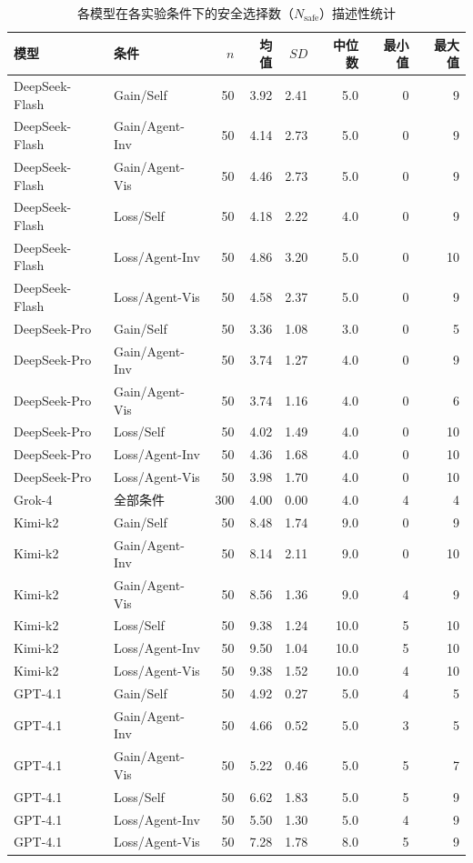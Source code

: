 \documentclass[journal]{vgtc}
\begin{document}
\begin{table}[tb]
  \caption{各模型在各实验条件下的安全选择数（$N_{\text{safe}}$）描述性统计}
  \label{tab:descriptive}
  \centering
  \footnotesize
  \setlength{\tabcolsep}{4pt}
  \begin{tabular}{llrrrrrr}
    \toprule
    模型 & 条件 & $n$ & 均值 & $SD$ & 中位数 & 最小值 & 最大值 \\
    \midrule
    DeepSeek-Flash & Gain/Self & 50 & 3.92 & 2.41 & 5.0 & 0 & 9 \\
    DeepSeek-Flash & Gain/Agent-Inv & 50 & 4.14 & 2.73 & 5.0 & 0 & 9 \\
    DeepSeek-Flash & Gain/Agent-Vis & 50 & 4.46 & 2.73 & 5.0 & 0 & 9 \\
    DeepSeek-Flash & Loss/Self & 50 & 4.18 & 2.22 & 4.0 & 0 & 9 \\
    DeepSeek-Flash & Loss/Agent-Inv & 50 & 4.86 & 3.20 & 5.0 & 0 & 10 \\
    DeepSeek-Flash & Loss/Agent-Vis & 50 & 4.58 & 2.37 & 5.0 & 0 & 9 \\
    DeepSeek-Pro & Gain/Self & 50 & 3.36 & 1.08 & 3.0 & 0 & 5 \\
    DeepSeek-Pro & Gain/Agent-Inv & 50 & 3.74 & 1.27 & 4.0 & 0 & 9 \\
    DeepSeek-Pro & Gain/Agent-Vis & 50 & 3.74 & 1.16 & 4.0 & 0 & 6 \\
    DeepSeek-Pro & Loss/Self & 50 & 4.02 & 1.49 & 4.0 & 0 & 10 \\
    DeepSeek-Pro & Loss/Agent-Inv & 50 & 4.36 & 1.68 & 4.0 & 0 & 10 \\
    DeepSeek-Pro & Loss/Agent-Vis & 50 & 3.98 & 1.70 & 4.0 & 0 & 10 \\
    Grok-4 & 全部条件 & 300 & 4.00 & 0.00 & 4.0 & 4 & 4 \\
    Kimi-k2 & Gain/Self & 50 & 8.48 & 1.74 & 9.0 & 0 & 9 \\
    Kimi-k2 & Gain/Agent-Inv & 50 & 8.14 & 2.11 & 9.0 & 0 & 10 \\
    Kimi-k2 & Gain/Agent-Vis & 50 & 8.56 & 1.36 & 9.0 & 4 & 9 \\
    Kimi-k2 & Loss/Self & 50 & 9.38 & 1.24 & 10.0 & 5 & 10 \\
    Kimi-k2 & Loss/Agent-Inv & 50 & 9.50 & 1.04 & 10.0 & 5 & 10 \\
    Kimi-k2 & Loss/Agent-Vis & 50 & 9.38 & 1.52 & 10.0 & 4 & 10 \\
    GPT-4.1 & Gain/Self & 50 & 4.92 & 0.27 & 5.0 & 4 & 5 \\
    GPT-4.1 & Gain/Agent-Inv & 50 & 4.66 & 0.52 & 5.0 & 3 & 5 \\
    GPT-4.1 & Gain/Agent-Vis & 50 & 5.22 & 0.46 & 5.0 & 5 & 7 \\
    GPT-4.1 & Loss/Self & 50 & 6.62 & 1.83 & 5.0 & 5 & 9 \\
    GPT-4.1 & Loss/Agent-Inv & 50 & 5.50 & 1.30 & 5.0 & 4 & 9 \\
    GPT-4.1 & Loss/Agent-Vis & 50 & 7.28 & 1.78 & 8.0 & 5 & 9 \\
    \bottomrule
  \end{tabular}
\end{table}
\end{document}

